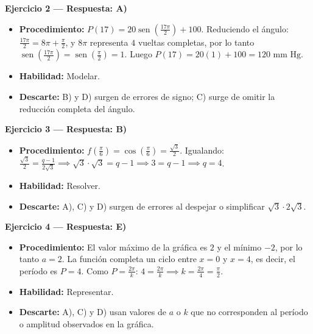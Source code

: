 \documentclass[12pt,letterpaper]{article}
\providecommand{\sen}{\operatorname{sen}}
\begin{document}
\vspace{1.2cm}

\textbf{Ejercicio 2 --- Respuesta: A)}
\begin{itemize}[leftmargin=*]
    \item \textbf{Procedimiento:} $P(17)=20\sen\left(\frac{17\pi}{2}\right)+100$. Reduciendo el ángulo: $\frac{17\pi}{2}=8\pi+\frac{\pi}{2}$, y $8\pi$ representa $4$ vueltas completas, por lo tanto $\sen\left(\frac{17\pi}{2}\right)=\sen\left(\frac{\pi}{2}\right)=1$. Luego $P(17)=20(1)+100=120\text{ mm Hg}$.
    \item \textbf{Habilidad:} Modelar.
    \item \textbf{Descarte:} B) y D) surgen de errores de signo; C) surge de omitir la reducción completa del ángulo.
\end{itemize}

\vspace{1.2cm}

\textbf{Ejercicio 3 --- Respuesta: B)}
\begin{itemize}[leftmargin=*]
    \item \textbf{Procedimiento:} $f\left(\frac{\pi}{6}\right)=\cos\left(\frac{\pi}{6}\right)=\frac{\sqrt3}{2}$. Igualando: $\frac{\sqrt3}{2}=\frac{q-1}{2\sqrt3} \implies \sqrt3\cdot\sqrt3=q-1 \implies 3=q-1 \implies q=4$.
    \item \textbf{Habilidad:} Resolver.
    \item \textbf{Descarte:} A), C) y D) surgen de errores al despejar o simplificar $\sqrt3\cdot2\sqrt3$.
\end{itemize}

\vspace{1.2cm}

\textbf{Ejercicio 4 --- Respuesta: E)}
\begin{itemize}[leftmargin=*]
    \item \textbf{Procedimiento:} El valor máximo de la gráfica es $2$ y el mínimo $-2$, por lo tanto $a=2$. La función completa un ciclo entre $x=0$ y $x=4$, es decir, el período es $P=4$. Como $P=\frac{2\pi}{k}$: $4=\frac{2\pi}{k} \implies k=\frac{2\pi}{4}=\frac{\pi}{2}$.
    \item \textbf{Habilidad:} Representar.
    \item \textbf{Descarte:} A), C) y D) usan valores de $a$ o $k$ que no corresponden al período o amplitud observados en la gráfica.
\end{itemize}

\vspace{1.2cm}
\end{document}

